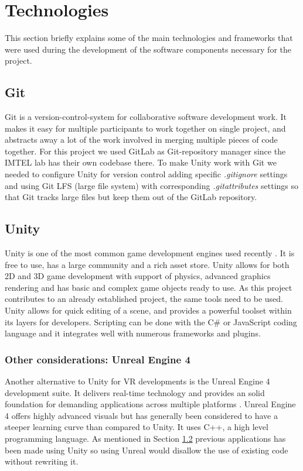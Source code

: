 \section{Technologies}
\label{sec:technologies}
This section briefly explains some of the main technologies and frameworks that were used during the development of the software components necessary for the project. 

\subsection{Git}
Git is a version-control-system for collaborative software development work. It makes it easy for multiple participants to work together on single project, and abstracts away a lot of the work involved in merging multiple pieces of code together. For this project we used GitLab \cite{GitLab} as Git-repository manager since the IMTEL lab has their own codebase there. To make Unity work with Git we needed to configure Unity for version control adding specific \textit{.gitignore} settings and using Git LFS (large file system) with corresponding \textit{.gitattributes} settings so that Git tracks large files but keep them out of the GitLab repository. 

\subsection{Unity}
\label{section: untiy}
Unity is one of the most common game development engines used recently \cite{unity}. It is free to use, has a large community and a rich asset store. Unity allows for both 2D and 3D game development with support of physics, advanced graphics rendering and has basic and complex game objects ready to use. As this project contributes to an already established project, the same tools need to be used. Unity allows for quick editing of a scene, and provides a powerful toolset within its layers for developers. Scripting can be done with the C\# or JavaScript coding language and it integrates well with numerous frameworks and plugins.

\subsubsection{Other considerations: Unreal Engine 4}
Another alternative to Unity for VR developments is the Unreal Engine 4 development suite. It delivers real-time technology and provides an solid foundation for demanding applications across multiple platforms \cite{unrealEngine}. Unreal Engine 4 offers highly advanced visuals but has generally been considered to have a steeper learning curve than compared to Unity. It uses C++, a high level programming language. As mentioned in Section \ref{section: untiy} previous applications has been made using Unity so using Unreal would disallow the use of existing code without rewriting it.       

